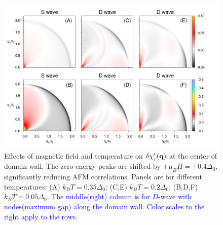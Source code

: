 \documentclass[prb,aps,showpacs,amsmath,twocolumn,10pt]{revtex4-1}
\newcommand{\blue}{\textcolor{blue}}
\newcommand{\red}{\textcolor{red}}
\begin{document}
\begin{figure}
\includegraphics[scale=0.1]{./Fig3}
\caption{\label{fig:sus_TB}
Effects of magnetic field and temperature on  $\delta\chi'_{{}_I}({\bf q})$ at the center of domain wall. 
The zero-energy peaks are shifted by $\pm\mu_BH = \pm0.4\Delta_0$, significantly reducing 
AFM correlations. 
Panels are for different temperatures: 
(A) $k_B T = 0.35\Delta_0$;  
(C,E) $k_B T = 0.2\Delta_0$; 
(B,D,F) $k_B T = 0.05\Delta_0$. 
\blue{The middle(right) column is for $D$-wave with nodes(maximum gap) along the domain wall. Color scales to the right apply to the rows.}
} 
\end{figure}
\end{document}
